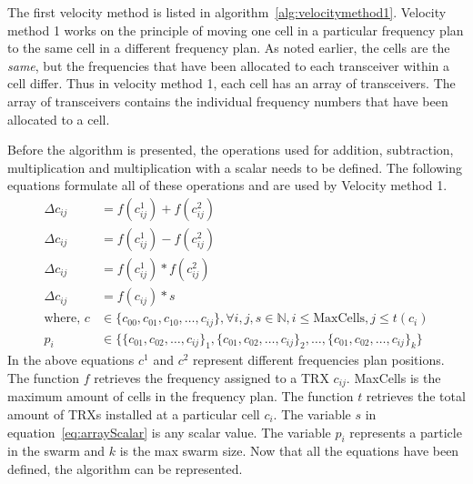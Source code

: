 The first velocity method is listed in algorithm~\ref{alg:velocitymethod1}. Velocity method 1 works on the principle of moving one cell in a particular frequency plan to the same cell in a different frequency plan. As noted earlier, the cells are the \emph{same}, but the frequencies that have been allocated to each transceiver within a cell differ. Thus in velocity method 1, each cell has an array of transceivers. The array of transceivers contains the individual frequency numbers that have been allocated to a cell.

Before the algorithm is presented, the operations used for addition, subtraction, multiplication and multiplication with a scalar needs to be defined. The following equations formulate all of these operations and are used by Velocity method 1.
\begin{align}
    \Delta c_{ij} &= f(c^1_{ij}) + f(c^2_{ij})\label{eq:arrayAdd}\\
    \Delta c_{ij} &= f(c^1_{ij}) - f(c^2_{ij})\label{eq:arraySubtract}\\
	\Delta c_{ij} &= f(c^1_{ij}) * f(c^2_{ij})\label{eq:arrayMultiply}\\
    \Delta c_{ij} &= f(c_{ij}) * s \label{eq:arrayScalar}\\
    \text{where, }c &\in \{c_{00},c_{01},c_{10}, \dots, c_{ij}\} , \forall i,j,s \in \mathbb{N}, i \leq \text{MaxCells}, j \leq t(c_i)\nonumber\\ 
    p_i &\in \{\{c_{01},c_{02},\dots,c_{ij}\}_1,\{c_{01},c_{02},\dots,c_{ij}\}_2, \dots,\{c_{01},c_{02},\dots,c_{ij}\}_k\}\nonumber
\end{align}
In the above equations $c^1$ and $c^2$ represent different frequencies plan positions. The function $f$ retrieves the frequency assigned to a TRX $c_{ij}$. MaxCells is the maximum amount of cells in the frequency plan. The function $t$ retrieves the total amount of TRXs installed at a particular cell $c_i$. The variable $s$ in equation~\ref{eq:arrayScalar} is any scalar value. The variable $p_i$ represents a particle in the swarm and $k$ is the max swarm size. Now that all the equations have been defined, the algorithm can be represented. 

